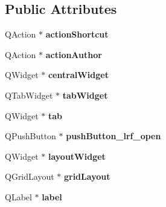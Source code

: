 \subsection*{Public Attributes}
\begin{DoxyCompactItemize}
\item 
\hypertarget{class_ui___main_window_adc1a970564dde02b162f66db0495114d}{}Q\+Action $\ast$ {\bfseries action\+Shortcut}\label{class_ui___main_window_adc1a970564dde02b162f66db0495114d}

\item 
\hypertarget{class_ui___main_window_a5a231f47d88c3b71593d5766acb72ce6}{}Q\+Action $\ast$ {\bfseries action\+Author}\label{class_ui___main_window_a5a231f47d88c3b71593d5766acb72ce6}

\item 
\hypertarget{class_ui___main_window_a30075506c2116c3ed4ff25e07ae75f81}{}Q\+Widget $\ast$ {\bfseries central\+Widget}\label{class_ui___main_window_a30075506c2116c3ed4ff25e07ae75f81}

\item 
\hypertarget{class_ui___main_window_a3260b943854b841c986f47c4726ee7f9}{}Q\+Tab\+Widget $\ast$ {\bfseries tab\+Widget}\label{class_ui___main_window_a3260b943854b841c986f47c4726ee7f9}

\item 
\hypertarget{class_ui___main_window_a3efc28c664e9f5115095aafbbc5ac6bc}{}Q\+Widget $\ast$ {\bfseries tab}\label{class_ui___main_window_a3efc28c664e9f5115095aafbbc5ac6bc}

\item 
\hypertarget{class_ui___main_window_a098e217ec87c740d62b047d2bc0137ad}{}Q\+Push\+Button $\ast$ {\bfseries push\+Button\+\_\+lrf\+\_\+open}\label{class_ui___main_window_a098e217ec87c740d62b047d2bc0137ad}

\item 
\hypertarget{class_ui___main_window_ab96ab0f0578098521fa69a75aa5cdde8}{}Q\+Widget $\ast$ {\bfseries layout\+Widget}\label{class_ui___main_window_ab96ab0f0578098521fa69a75aa5cdde8}

\item 
\hypertarget{class_ui___main_window_a525ed3c5fe0784ac502ee222fba4e205}{}Q\+Grid\+Layout $\ast$ {\bfseries grid\+Layout}\label{class_ui___main_window_a525ed3c5fe0784ac502ee222fba4e205}

\item 
\hypertarget{class_ui___main_window_ad9c89133780f28e6efa2ec17ceb9cff5}{}Q\+Label $\ast$ {\bfseries label}\label{class_ui___main_window_ad9c89133780f28e6efa2ec17ceb9cff5}


\end{DoxyCompactItemize}
